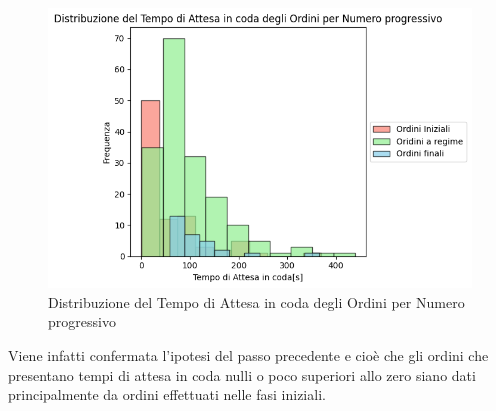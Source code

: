 \begin{figure}[H]
	\centering
	\includegraphics[scale=0.6]{iterazione3/images/distr_t_attesa_coda_nrordine.png}
	\caption{Distribuzione del Tempo di Attesa in coda degli Ordini per Numero progressivo\label{fig:distr_t_attesa_coda_nrordine}}
\end{figure}
Viene infatti confermata l'ipotesi del passo precedente e cioè che gli ordini che presentano tempi di attesa in coda nulli o poco superiori allo zero siano dati principalmente da ordini effettuati nelle fasi iniziali.

